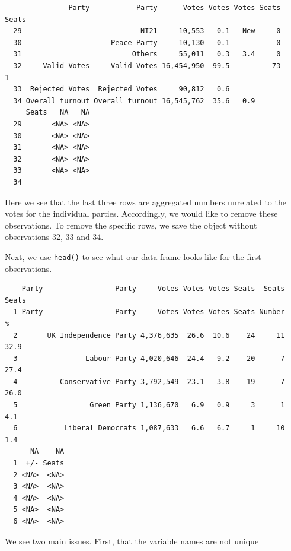 \documentclass[12pt,oneside]{reedthesis}
\theoremstyle{definition}
\theoremstyle{definition}
\theoremstyle{definition}
\theoremstyle{remark}
\begin{document}
  \begin{verbatim}
               Party           Party      Votes Votes Votes Seats Seats
  29                            NI21     10,553   0.1   New     0      
  30                     Peace Party     10,130   0.1           0      
  31                          Others     55,011   0.3   3.4     0      
  32     Valid Votes     Valid Votes 16,454,950  99.5          73     1
  33  Rejected Votes  Rejected Votes     90,812   0.6                  
  34 Overall turnout Overall turnout 16,545,762  35.6   0.9            
     Seats   NA   NA
  29       <NA> <NA>
  30       <NA> <NA>
  31       <NA> <NA>
  32       <NA> <NA>
  33       <NA> <NA>
  34                
  \end{verbatim}
  Here we see that the last three rows are aggregated numbers unrelated to
  the votes for the individual parties. Accordingly, we would like to
  remove these observations. To remove the specific rows, we save the
  object without observations 32, 33 and 34.
  \begin{Shaded}
  \begin{Highlighting}[]
  \StringTok{ }\NormalTok{ep14_raw[}\OperatorTok{-}\NormalTok{(}\OperatorTok{:}\NormalTok{), ]}
  \end{Highlighting}
  \end{Shaded}
  Next, we use \texttt{head()} to see what our data frame looks like for
  the first observations.
  \begin{Shaded}
  \begin{Highlighting}[]
  \end{Highlighting}
  \end{Shaded}
  \begin{verbatim}
    Party                 Party     Votes Votes Votes Seats  Seats Seats
  1 Party                 Party     Votes Votes Votes Seats Number     %
  2       UK Independence Party 4,376,635  26.6  10.6    24     11  32.9
  3                Labour Party 4,020,646  24.4   9.2    20      7  27.4
  4          Conservative Party 3,792,549  23.1   3.8    19      7  26.0
  5                 Green Party 1,136,670   6.9   0.9     3      1   4.1
  6           Liberal Democrats 1,087,633   6.6   6.7     1     10   1.4
      NA    NA
  1  +/- Seats
  2 <NA>  <NA>
  3 <NA>  <NA>
  4 <NA>  <NA>
  5 <NA>  <NA>
  6 <NA>  <NA>
  \end{verbatim}
  We see two main issues. First, that the variable names are not unique
\end{document}
